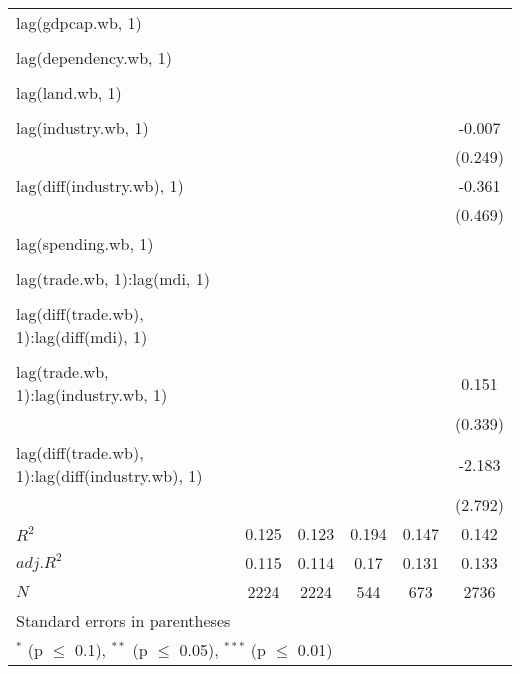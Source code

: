 \begin{tabular}{l*{5}{c}}
lag(gdpcap.wb, 1) 		& 		& 		& 		& 		& \\
  		& 		& 		& 		& 		& \\
lag(dependency.wb, 1) 		& 		& 		& 		& 		& \\
  		& 		& 		& 		& 		& \\
lag(land.wb, 1) 		& 		& 		& 		& 		& \\
  		& 		& 		& 		& 		& \\
lag(industry.wb, 1) 		& 		& 		& 		& 		&-0.007 \\
  		& 		& 		& 		& 		&(0.249) \\
lag(diff(industry.wb), 1) 		& 		& 		& 		& 		&-0.361 \\
  		& 		& 		& 		& 		&(0.469) \\
lag(spending.wb, 1) 		& 		& 		& 		& 		& \\
  		& 		& 		& 		& 		& \\
lag(trade.wb, 1):lag(mdi, 1) 		& 		& 		& 		& 		& \\
  		& 		& 		& 		& 		& \\
lag(diff(trade.wb), 1):lag(diff(mdi), 1) 		& 		& 		& 		& 		& \\
  		& 		& 		& 		& 		& \\
lag(trade.wb, 1):lag(industry.wb, 1) 		& 		& 		& 		& 		&0.151 \\
  		& 		& 		& 		& 		&(0.339) \\
lag(diff(trade.wb), 1):lag(diff(industry.wb), 1) 		& 		& 		& 		& 		&-2.183 \\
  		& 		& 		& 		& 		&(2.792) \\
\hline
$R^2$ 		&0.125 		&0.123 		&0.194 		&0.147 		&0.142 \\
$adj.R^2$ 		&0.115 		&0.114 		&0.17 		&0.131 		&0.133 \\
$N$ 		&\multicolumn{1}{c}{2224} 		&\multicolumn{1}{c}{2224} 		&\multicolumn{1}{c}{544} 		&\multicolumn{1}{c}{673} 		&\multicolumn{1}{c}{2736} \\
\hline\hline
\multicolumn{6}{l}{\footnotesize Standard errors in parentheses}\\
\multicolumn{6}{l}{\footnotesize $^{*}$ (p $\le$ 0.1), $^{**}$ (p $\le$ 0.05), $^{***}$ (p $\le$ 0.01)}\\
\end{tabular}

